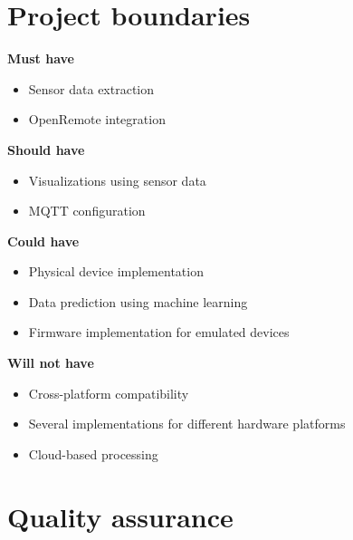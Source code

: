 \documentclass{report}
\begin{document}
	
	\chapter{Project boundaries} \label{project_boundaries}
	
	\textbf{Must have}
	\begin{itemize}
		\item Sensor data extraction
		\item OpenRemote integration
	\end{itemize}
	
	\textbf{Should have}
	\begin{itemize}
		\item Visualizations using sensor data
		\item MQTT configuration
	\end{itemize}
	
	\textbf{Could have}
	\begin{itemize}
		\item Physical device implementation
		\item Data prediction using machine learning
		\item Firmware implementation for emulated devices
	\end{itemize}
	
	\textbf{Will not have}
	\begin{itemize}
		\item Cross-platform compatibility
		\item Several implementations for different hardware platforms 
		\item Cloud-based processing
	\end{itemize}
	
	
	\chapter{Quality assurance}\label{quality_assurance}
	
\end{document}
